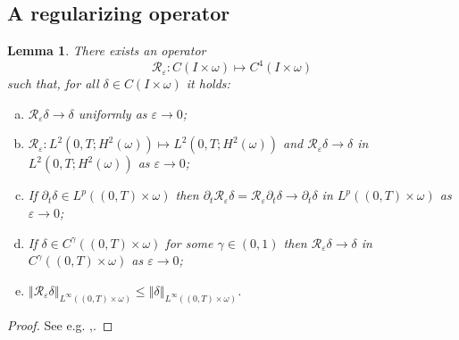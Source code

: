 \documentclass[10pt,a4paper]{article}
\newtheorem{lemma}[theorem]{Lemma}
\numberwithin{equation}{section}
\begin{document}
\subsection{A regularizing operator}\label{ssec:regularizing-op}
\begin{lemma}
\label{lm:regularizers}
There exists an operator \[\mathcal{R}_{\varepsilon}:C\left(I\times\omega\right)\mapsto C^{4}\left(I\times\omega\right)\] such that, for all  $\delta\in C\left(I\times\omega\right)$ it holds:
\begin{enumerate}[(a)]
\item $\mathcal{R}_{\varepsilon}\delta\to\delta$ uniformly as $\varepsilon \to 0$;
\item $\mathcal{R}_{\varepsilon}:L^{2}\left(0,T;H^{2}\left(\omega\right)\right)\mapsto L^{2}\left(0,T;H^{2}\left(\omega\right)\right)$ and $\mathcal{R}_{\varepsilon}\delta\to\delta$ in $L^{2}\left(0,T;H^{2}\left(\omega\right)\right)$ as $\varepsilon \to 0$;
\item If $\partial_{t}\delta\in L^{p}\left(\left(0,T\right)\times\omega\right)$ then $\partial_{t}\mathcal{R}_{\varepsilon}\delta=\mathcal{R}_{\varepsilon}\partial_{t}\delta\to\partial_{t}\delta$ in $L^{p}\left(\left(0,T\right)\times\omega\right)$ as $\varepsilon \to 0$;
\item If $\delta\in C^{\gamma}\left(\left(0,T\right)\times\omega\right)$ for some $\gamma \in (0,1)$ then $\mathcal{R}_{\varepsilon}\delta\to\delta$ in $C^{\gamma}\left(\left(0,T\right)\times\omega\right)$ as $\varepsilon \to 0$;
\item $\left\Vert \mathcal{R}_{\varepsilon}\delta\right\Vert _{L^{\infty}\left(\left(0,T\right)\times\omega\right)}\le\left\Vert \delta\right\Vert _{L^{\infty}\left(\left(0,T\right)\times\omega\right)}$.
\end{enumerate}
\end{lemma}
\begin{proof}
   See e.g. \cite{LR14},\cite{BS18}.
\end{proof}
\end{document}
